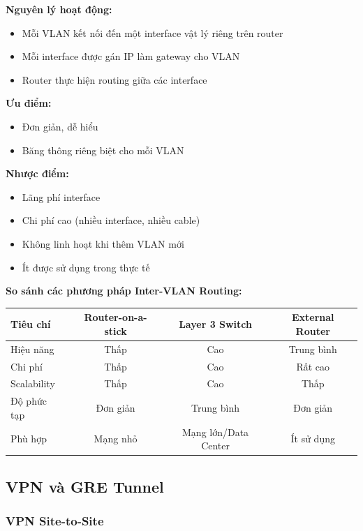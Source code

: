 \textbf{Nguyên lý hoạt động:}
\begin{itemize}
    \item Mỗi VLAN kết nối đến một interface vật lý riêng trên router
    \item Mỗi interface được gán IP làm gateway cho VLAN
    \item Router thực hiện routing giữa các interface
\end{itemize}

\textbf{Ưu điểm:}
\begin{itemize}
    \item Đơn giản, dễ hiểu
    \item Băng thông riêng biệt cho mỗi VLAN
\end{itemize}

\textbf{Nhược điểm:}
\begin{itemize}
    \item Lãng phí interface
    \item Chi phí cao (nhiều interface, nhiều cable)
    \item Không linh hoạt khi thêm VLAN mới
    \item Ít được sử dụng trong thực tế
\end{itemize}

\textbf{So sánh các phương pháp Inter-VLAN Routing:}

\begin{center}
\begin{tabular}{|l|c|c|c|}
\hline
\textbf{Tiêu chí} & \textbf{Router-on-a-stick} & \textbf{Layer 3 Switch} & \textbf{External Router} \\
\hline
Hiệu năng & Thấp & Cao & Trung bình \\
\hline
Chi phí & Thấp & Cao & Rất cao \\
\hline
Scalability & Thấp & Cao & Thấp \\
\hline
Độ phức tạp & Đơn giản & Trung bình & Đơn giản \\
\hline
Phù hợp & Mạng nhỏ & Mạng lớn/Data Center & Ít sử dụng \\
\hline
\end{tabular}
\end{center}

\subsection{VPN và GRE Tunnel}

\subsubsection{VPN Site-to-Site}

